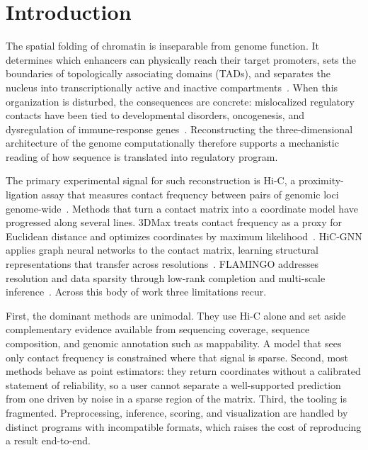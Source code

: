 \documentclass[conference]{IEEEtran}
\begin{document}
\section{Introduction}
The spatial folding of chromatin is inseparable from genome function. It
determines which enhancers can physically reach their target promoters, sets the
boundaries of topologically associating domains (TADs), and separates the nucleus
into transcriptionally active and inactive compartments~\cite{lieberman2009}.
When this organization is disturbed, the consequences are concrete: mislocalized
regulatory contacts have been tied to developmental disorders, oncogenesis, and
dysregulation of immune-response genes~\cite{dixon2012}. Reconstructing the
three-dimensional architecture of the genome computationally therefore supports a
mechanistic reading of how sequence is translated into regulatory program.

The primary experimental signal for such reconstruction is Hi-C, a
proximity-ligation assay that measures contact frequency between pairs of
genomic loci genome-wide~\cite{rao2014}. Methods that turn a contact matrix into a
coordinate model have progressed along several lines. 3DMax treats contact
frequency as a proxy for Euclidean distance and optimizes coordinates by maximum
likelihood~\cite{oluwadare2018}. HiC-GNN applies graph neural networks to the
contact matrix, learning structural representations that transfer across
resolutions~\cite{hicgnn2022}. FLAMINGO addresses resolution and data sparsity
through low-rank completion and multi-scale inference~\cite{flamingo2022}. Across
this body of work three limitations recur.

First, the dominant methods are unimodal. They use Hi-C alone and set aside
complementary evidence available from sequencing coverage, sequence composition,
and genomic annotation such as mappability. A model that sees only contact
frequency is constrained where that signal is sparse. Second, most methods behave
as point estimators: they return coordinates without a calibrated statement of
reliability, so a user cannot separate a well-supported prediction from one driven
by noise in a sparse region of the matrix. Third, the tooling is fragmented.
Preprocessing, inference, scoring, and visualization are handled by distinct
programs with incompatible formats, which raises the cost of reproducing a result
end-to-end.
\end{document}
